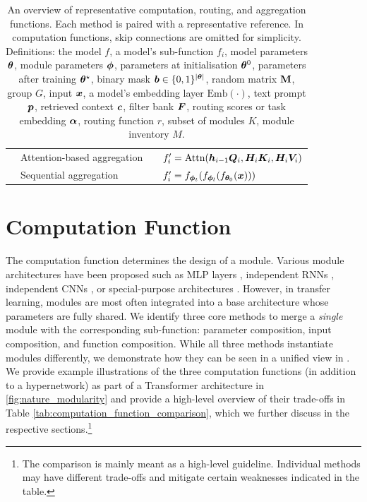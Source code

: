 \documentclass[10pt]{article} %
\begin{document}
\begin{table}[p]
{\begin{tabular}{llll}
& Attention-based aggregation & \citet{pfeiffer2020adapterfusion} & $f_i^\prime = \text{Attn}({\bm{h}}_{i-1} {\bm{Q}}_i, {\bm{H}}_i {\bm{K}}_i, {\bm{H}}_i {\bm{V}}_i)$ \\
& Sequential aggregation & \citet{pfeiffer-etal-2020-mad} & $f_i^\prime = f_{{\bm{\phi}}_t} ( f_{{\bm{\phi}}_l}(f_{{\bm{\theta}}_0}({\bm{x}})))$ \\
\bottomrule
\end{tabular}%
}
\caption{An overview of representative computation, routing, and aggregation functions. Each method is paired with a representative reference. In computation functions, skip connections are omitted for simplicity. Definitions: the model $f$, a model's sub-function $f_i$, model parameters ${\bm{\theta}}$, module parameters ${\bm{\phi}}$, parameters at initialisation ${\bm{\theta}}^{0}$, parameters after training ${\bm{\theta}}^\star$, binary mask ${\bm{b}} \in \{0, 1\}^{|{\bm{\theta}}|}$, random matrix ${\mathbf{M}}$, group $G$, input ${\bm{x}}$, a model's embedding layer $\text{Emb}(\cdot)$, text prompt ${\bm{p}}$, retrieved context ${\bm{c}}$, filter bank ${\bm{F}}$, routing scores or task embedding ${\bm{\alpha}}$, routing function $r$, subset of modules $K$, module inventory $M$.}
\label{tab:overview_representative_methods}
\end{table}

\section{Computation Function}
\label{sec:nature_modularity}

The computation function determines the design of a module. Various module architectures have been proposed such as MLP layers \citep{rosenbaum2017routing,kirsch2018modular,chang2018automatically},
independent RNNs \citep{goyal2019recurrent}, independent CNNs \citep{parascandolo2018learning}, or special-purpose architectures \citep{andreas2016nmn}. However, in transfer learning, modules are most often integrated into a base architecture whose parameters are fully shared. 
We identify three core methods to merge a \textit{single} module with the corresponding sub-function: parameter composition, input composition, and function composition. While all three methods instantiate modules differently, we demonstrate how they can be seen in a unified view in . We provide example illustrations of the three computation functions (in addition to a hypernetwork) as part of a Transformer architecture in \cref{fig:nature_modularity} and provide a high-level overview of their trade-offs in Table \ref{tab:computation_function_comparison}, which we further discuss in the respective sections.\footnote{The comparison is mainly meant as a high-level guideline. Individual methods may have different trade-offs and mitigate certain weaknesses indicated in the table.}
\end{document}
